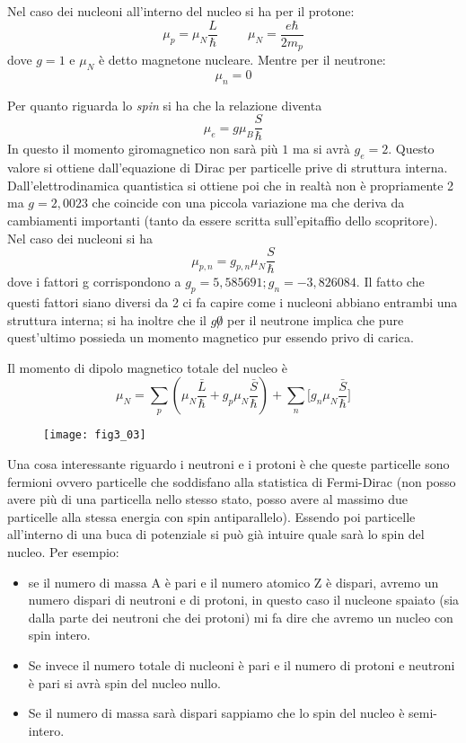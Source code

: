 Nel caso dei nucleoni all'interno del nucleo si ha per il protone:
\begin{equation}
\mu_p=\mu_N\frac{L}{\hbar}\hspace{1cm}\mu_N=\frac{e\hbar}{2m_p}
\end{equation}
dove $g=1$ e $\mu_N$ è detto magnetone nucleare.
Mentre per il neutrone:
\begin{equation}
\mu_n=0
\end{equation}

Per quanto riguarda lo \emph{spin} si ha che la relazione diventa
\begin{equation}
\mu_e=g\mu_B \frac{S}{\hbar}
\end{equation}
In questo il momento giromagnetico non sarà più $1$ ma si avrà $g_e=2$.
Questo valore si ottiene dall'equazione di Dirac per particelle prive di struttura interna.
Dall'elettrodinamica quantistica si ottiene poi che in realtà non è propriamente 2 ma $g=2,0023$ che coincide con una piccola variazione ma che deriva da cambiamenti importanti (tanto da essere scritta sull'epitaffio dello scopritore).
Nel caso dei nucleoni si ha
\begin{equation}
\mu_{p,n}=g_{p,n}\mu_N\frac{S}{\hbar}
\end{equation}
dove i fattori g corrispondono a $g_p=5,585691; g_n=-3,826084$.
Il fatto che questi fattori siano diversi da 2 ci fa capire come i nucleoni abbiano entrambi una struttura interna; si ha inoltre che il $g\not0$ per il neutrone implica che pure quest'ultimo possieda un momento magnetico pur essendo privo di carica.

Il momento di dipolo magnetico totale del nucleo è
\begin{equation}
\mu_N=\sum_p \left(\mu_N \frac{\bar{L}}{\hbar}+g_p\mu_N\frac{\bar S}{\hbar}\right)+\sum_n \biggl[g_n \mu_N\frac{\bar S}{\hbar}\biggl]
\end{equation}
\begin{figure}
\centering
\texttt{[image: fig3\_03]}
\end{figure}
Una cosa interessante riguardo i neutroni e i protoni è che queste particelle sono fermioni ovvero particelle che soddisfano alla statistica di Fermi-Dirac (non posso avere più di una particella nello stesso stato, posso avere al massimo due particelle alla stessa energia con spin antiparallelo).
Essendo poi particelle all'interno di una buca di potenziale si può già intuire quale sarà lo spin del nucleo.
Per esempio:
\begin{itemize}
\item se il numero di massa A è pari e il numero atomico Z è dispari, avremo un numero dispari di neutroni e di protoni, in questo caso il nucleone spaiato (sia dalla parte dei neutroni che dei protoni) mi fa dire che avremo un nucleo con spin intero.
\item Se invece il numero totale di nucleoni è pari e il numero di protoni e neutroni è pari si avrà spin del nucleo nullo.
\item Se il numero di massa sarà dispari sappiamo che lo spin del nucleo è semi-intero.
\end{itemize} 


